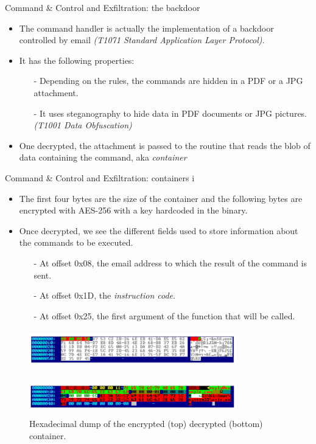 \begin{frame}[fragile]{Command \& Control and Exfiltration: the backdoor}
    \begin{itemize}
        \item The command handler is actually the implementation of a backdoor controlled by email 
        \emph{(T1071 Standard Application Layer Protocol)}.
        \item It has the following properties:
        \begin{itemize}
            \item[-] Depending on the rules, the commands are hidden in a PDF or a JPG attachment. 
            \item[-] It uses steganography to hide data in PDF documents or JPG pictures. \emph{(T1001 Data Obfuscation)}
        \end{itemize}
        \item One decrypted, the attachment is passed to the routine that reads the blob of data containing the command, aka \emph{container}
    \end{itemize}
\end{frame}

\begin{frame}[fragile]{Command \& Control and Exfiltration: containers i}
    \begin{itemize}
        \item The first four bytes
        are the size of the container and the following bytes are encrypted with AES-256 with a key hardcoded
        in the binary.
        \item Once decrypted, we see the different fields used to store information about the commands to be executed.
        \begin{itemize}
            \item[-] At offset 0x08, the email address to which the result of the command is sent.
            \item[-] At offset 0x1D, the \emph{instruction code}.
            \item[-] At offset 0x25, the first argument of the function that will be called.
        \end{itemize}
    \end{itemize}
    \begin{figure}
        \includegraphics[height=1.6cm, width=9cm]{figures/encr_dump.PNG}
    \end{figure}
    \begin{figure}
        \includegraphics[height=1.6cm, width=9cm]{figures/decr_dump.PNG}
        \caption{Hexadecimal dump of the encrypted (top) decrypted (bottom) container.}
    \end{figure}
\end{frame}



